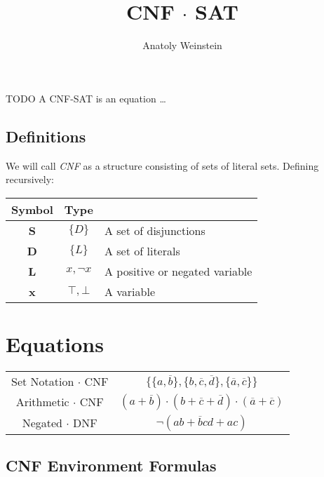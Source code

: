 \documentclass[12pt, letterpaper]{article}
\title{CNF $\cdot$ SAT}
\author{Anatoly Weinstein}
\begin{document}
    \maketitle

    TODO A CNF-SAT is an equation \ldots

    \subsection*{Definitions}

    We will call \emph{CNF} as a structure consisting of sets of
    literal sets. Defining recursively:

    \begin{center}
        \begin{tabular}{c|cl}
            Symbol & Type \\ \hline
            \textbf{S} & $\{D\}$ & A set of disjunctions \\
            \textbf{D} & $\{L\}$ & A set of literals \\
            \textbf{L} & $x, \lnot x$ & A positive or negated variable \\
            \textbf{x} & $\top, \bot$ & A variable \\
        \end{tabular}
    \end{center}

    \section{Equations}

    \begin{center}
        \begin{tabular}{cc}
            Set Notation $\cdot$ CNF & $\{\{a, \overline b\}, \{b, \overline c, \overline d\}, \{\overline a, \overline c\}\}$ \\[10px]
            Arithmetic $\cdot$ CNF & $(a+\overline b) \cdot (b +\overline c +\overline d) \cdot (\overline a +\overline c)$ \\[10px]
            Negated $\cdot$ DNF & $\lnot(ab + \overline bcd + ac)$ \\
        \end{tabular}
    \end{center}

    \subsection*{CNF Environment Formulas}
\end{document}
